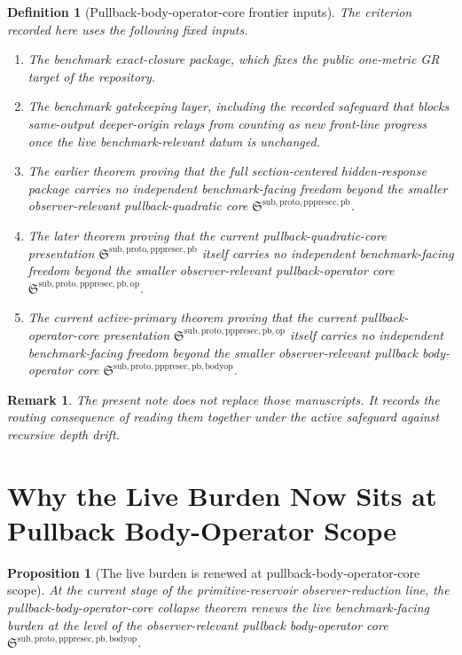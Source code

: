\documentclass[11pt]{article}
\newcommand{\PrePreProtoSectionPullbackCore}{\mathfrak S^{\mathrm{sub,proto,pppresec,pb}}}
\newcommand{\PullbackOperatorCore}{\mathfrak S^{\mathrm{sub,proto,pppresec,pb,op}}}
\newcommand{\PullbackBodyOperatorCore}{\mathfrak S^{\mathrm{sub,proto,pppresec,pb,bodyop}}}
\newtheorem{definition}{Definition}
\newtheorem{proposition}{Proposition}
\newtheorem{remark}{Remark}
\begin{document}
\begin{definition}[Pullback-body-operator-core frontier inputs]
The criterion recorded here uses the following fixed inputs.
\begin{enumerate}
    \item The benchmark exact-closure package, which fixes the public one-metric GR target of the repository.
    \item The benchmark gatekeeping layer, including the recorded safeguard that blocks same-output deeper-origin relays from counting as new front-line progress once the live benchmark-relevant datum is unchanged.
    \item The earlier theorem proving that the full section-centered hidden-response package carries no independent benchmark-facing freedom beyond the smaller observer-relevant pullback-quadratic core \(\PrePreProtoSectionPullbackCore\).
    \item The later theorem proving that the current pullback-quadratic-core presentation \(\PrePreProtoSectionPullbackCore\) itself carries no independent benchmark-facing freedom beyond the smaller observer-relevant pullback-operator core \(\PullbackOperatorCore\).
    \item The current active-primary theorem proving that the current pullback-operator-core presentation \(\PullbackOperatorCore\) itself carries no independent benchmark-facing freedom beyond the smaller observer-relevant pullback body-operator core \(\PullbackBodyOperatorCore\).
\end{enumerate}
\end{definition}

\begin{remark}
The present note does not replace those manuscripts. It records the routing consequence of reading them together under the active safeguard against recursive depth drift.
\end{remark}

\section{Why the Live Burden Now Sits at Pullback Body-Operator Scope}

\begin{proposition}[The live burden is renewed at pullback-body-operator-core scope]
At the current stage of the primitive-reservoir observer-reduction line, the pullback-body-operator-core collapse theorem renews the live benchmark-facing burden at the level of the observer-relevant pullback body-operator core \(\PullbackBodyOperatorCore\).
\end{proposition}
\end{document}
